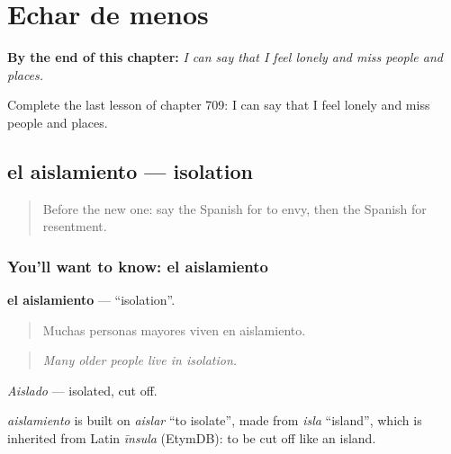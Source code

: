
\chapter{Echar de menos}
\label{ch:es-echar-de-menos}

\begin{chapteropening}
\textbf{By the end of this chapter:} \emph{I can say that I feel lonely and miss people and places.}

Complete the last lesson of chapter 709: I can say that I feel lonely and miss people and places.
\end{chapteropening}

\section[el aislamiento]{el aislamiento — isolation}

\label{lesson:ES-C709-aislamiento}



\begin{quote}
Before the new one: say the Spanish for to envy, then the Spanish for resentment.
\end{quote}

\subsection*{You'll want to know: el aislamiento}
\textbf{el aislamiento} — \textquotedblleft{}isolation\textquotedblright{}.

\begin{quote}
Muchas personas mayores viven en aislamiento.
\end{quote}

\begin{quote}
\emph{Many older people live in isolation.}
\end{quote}

\emph{Aislado} — isolated, cut off.

\begin{cousinweb}
\emph{aislamiento} is built on \emph{aislar} \textquotedblleft{}to isolate\textquotedblright{}, made from \emph{isla} \textquotedblleft{}island\textquotedblright{}, which is inherited from Latin \emph{īnsula} (EtymDB): to be cut off like an island.
\end{cousinweb}

